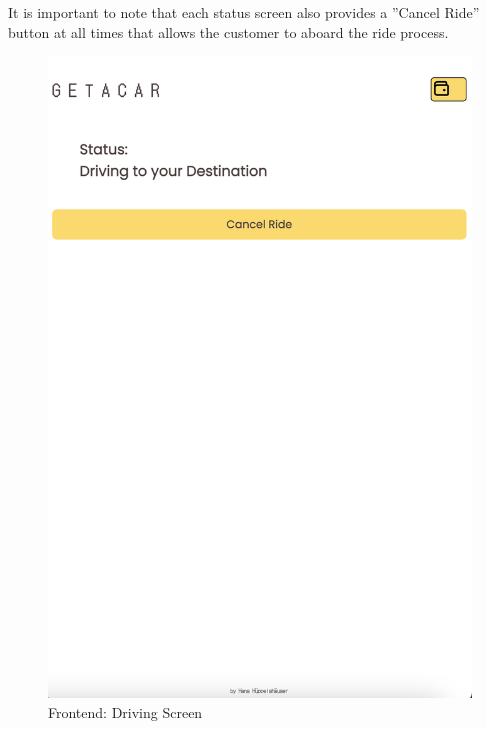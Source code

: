 It is important to note that each status screen also provides a ''Cancel Ride'' button at all times that allows the customer to aboard the ride process.

\begin{figure}[H]
    \centering
    
    \begin{minipage}{0.45\linewidth}
        \centering
        \includegraphics[width=\linewidth]{data/ffss/9.png}
        \caption{Frontend: Driving Screen}
        \label{fig:DrivingScreen}
    \end{minipage}
    \hfill
    \begin{minipage}{0.45\linewidth}
        \centering

\end{minipage}
\end{figure}
